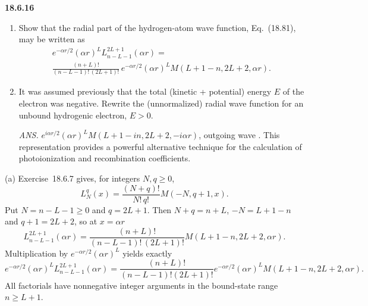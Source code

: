 \par\bigskip
\noindent\textbf{18.6.16}
\begin{enumerate}
\item[(a)] Show that the radial part of the hydrogen-atom wave
function, Eq.~(18.81), may be written as
\begin{multline*}
e^{-\alpha r/2}(\alpha r)^{L}L_{n-L-1}^{2L+1}(\alpha r)=\\
\frac{(n+L)!}{(n-L-1)!\,(2L+1)!}\,e^{-\alpha r/2}(\alpha r)^{L}
M(L+1-n,2L+2,\alpha r).
\end{multline*}
\item[(b)] It was assumed previously that the total (kinetic +
potential) energy $E$ of the electron was negative. Rewrite the
(unnormalized) radial wave function for an unbound hydrogenic
electron, $E>0$.
\par\nobreak\hfill\emph{ANS.}\enspace
$e^{i\alpha r/2}(\alpha r)^{L}M(L+1-in,2L+2,-i\alpha r)$,
outgoing wave .  This representation provides a powerful alternative
technique for the calculation of photoionization and recombination
coefficients.
\end{enumerate}
\par\nobreak
\solution
(a) Exercise~18.6.7 gives, for integers $N,q\ge0$,
\[
L_N^q(x)=\frac{(N+q)!}{N!\,q!}M(-N,q+1,x).
\]
Put $N=n-L-1\ge0$ and $q=2L+1$.  Then $N+q=n+L$, $-N=L+1-n$ and
$q+1=2L+2$, so at $x=\alpha r$
\[
L_{n-L-1}^{2L+1}(\alpha r)=\frac{(n+L)!}{(n-L-1)!\,(2L+1)!}
 M(L+1-n,2L+2,\alpha r).
\]
Multiplication by $e^{-\alpha r/2}(\alpha r)^L$ yields exactly
\[
\boxed{e^{-\alpha r/2}(\alpha r)^LL_{n-L-1}^{2L+1}(\alpha r)
 =\frac{(n+L)!}{(n-L-1)!(2L+1)!}
  e^{-\alpha r/2}(\alpha r)^LM(L+1-n,2L+2,\alpha r)}.
\]
All factorials have nonnegative integer arguments in the bound-state
range $n\ge L+1$.

